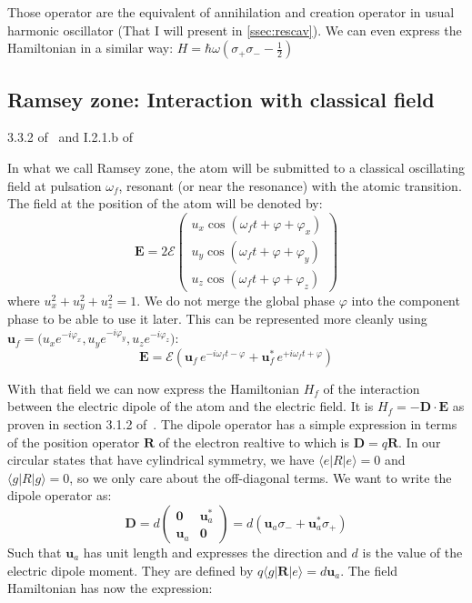 \documentclass[10pt]{report}
\theoremstyle{plain}
\theoremstyle{definition}
\theoremstyle{remark}
\newcommand{\ket}[1]{|#1\rangle}
\newcommand{\bra}[1]{\langle#1|}
\newcommand{\mat}[1]{\begin{pmatrix}#1\end{pmatrix}}
\newcommand{\bs}{\boldsymbol}
\begin{document}
Those operator are the equivalent of annihilation and creation operator in usual
harmonic oscillator (That I will present in \cref{ssec:rescav}). We can even
express the Hamiltonian in a similar way: $H = \hbar \omega(\sigma_+\sigma_- - \frac12)$




\subsection{Ramsey zone: Interaction with classical field}\label{sec:ramsey}

3.3.2 of~\cite{Har06} and I.2.1.b of~\cite{SayPHD11}

In what we call Ramsey zone, the atom will be submitted to a classical oscillating
field at pulsation $\omega_f$, resonant (or near the resonance) with the atomic
transition. The field at the position of the atom will
be denoted by:
\[\bs E = 2\mathcal{E}
  \mat{u_x\cos(\omega_f t + \varphi + \varphi_x)\\
    u_y\cos(\omega_f t + \varphi + \varphi_y)\\
    u_z\cos(\omega_f t + \varphi + \varphi_z)}\]
where $u_x^2 + u_y^2 +u_z^2 = 1$. We do not merge the global phase $\varphi$ into
the component phase to be able to use it later. This can be represented more
cleanly using $\bs u_f = \big(u_x e^{-i\varphi_x},u_y e^{-i\varphi_y},u_z
e^{-i\varphi_z}\big)$:
\begin{equation}\label{eqn:field}
\bs E = \mathcal{E} (\bs u_f\, e^{-i\omega_f t-\varphi} + \bs u_f^*\,
  e^{+i\omega_f t + \varphi})
\end{equation}


With that field we can now express the Hamiltonian $H_f$ of the
interaction between the electric dipole of the
atom and the electric field. It is $H_f = - \bs D \cdot \bs E$ as proven in
section 3.1.2 of~\cite{Har06}.
The dipole operator has a simple expression in terms
of the position operator $\bs R$ of the electron realtive to  which is $\bs D = q \bs R$.
In our circular states that have cylindrical symmetry,
we have $\bra e R \ket e = 0$ and $\bra g R \ket g = 0$,
so we only care about the off-diagonal terms. We want to write the dipole
operator as:
\begin{equation}\label{eqn:D}
  \bs D = d\mat{\bs 0&\bs u_a^*\\\bs u_a&\bs 0} = d(\bs u_a \sigma_- + \bs u_a^* \sigma_+)
\end{equation}
Such that $\bs u_a$ has unit length and expresses the direction
and $d$ is the value of the electric dipole
moment. They are defined by $ q \bra g \bs R \ket e = d \bs u_a$. The field
Hamiltonian has now the expression:
\end{document}
